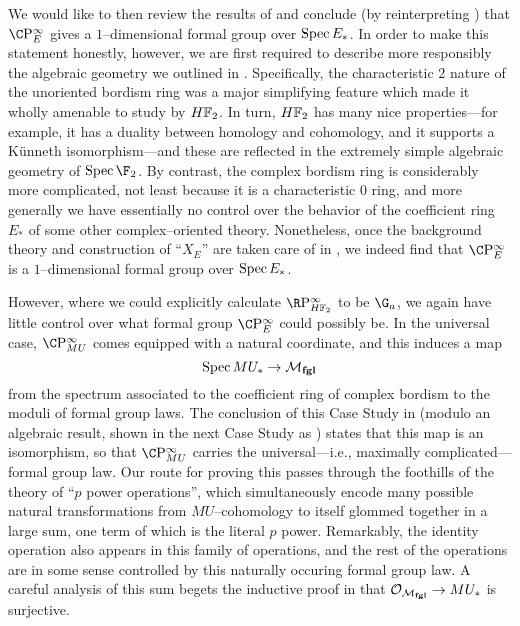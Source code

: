 We would like to then review the results of  and conclude (by reinterpreting ) that \(\CP^\infty_E\) gives a \(1\)--dimensional formal group over \(\operatorname{Spec} E_*\).  In order to make this statement honestly, however, we are first required to describe more responsibly the algebraic geometry we outlined in .  Specifically, the characteristic \(2\) nature of the unoriented bordism ring was a major simplifying feature which made it wholly amenable to study by \(\HFtwo\).  In turn, \(\HFtwo\) has many nice properties---for example, it has a duality between homology and cohomology, and it supports a K\"unneth isomorphism---and these are reflected in the extremely simple algebraic geometry of \(\Spec \F_2\).  By contrast, the complex bordism ring is considerably more complicated, not least because it is a characteristic \(0\) ring, and more generally we have essentially no control over the behavior of the coefficient ring \(E_*\) of some other complex--oriented theory.  Nonetheless, once the background theory and construction of ``\(X_E\)'' are taken care of in , we indeed find that \(\CP^\infty_E\) is a \(1\)--dimensional formal group over \(\operatorname{Spec} E_*\).

However, where we could explicitly calculate \(\RP^\infty_{\HFtwo}\) to be \(\G_a\), we again have little control over what formal group \(\CP^\infty_E\) could possibly be.  In the universal case, \(\CP^\infty_{MU}\) comes equipped with a natural coordinate, and this induces a map \[\operatorname{Spec} MU_* \to \mathcal{M}_{\mathbf{fgl}}\] from the spectrum associated to the coefficient ring of complex bordism to the moduli of formal group laws.  The conclusion of this Case Study in  (modulo an algebraic result, shown in the next Case Study as ) states that this map is an isomorphism, so that \(\CP^\infty_{MU}\) carries the universal---i.e., maximally complicated---formal group law.  Our route for proving this passes through the foothills of the theory of ``\(p\){\th} power operations'', which simultaneously encode many possible natural transformations from \(MU\)--cohomology to itself glommed together in a large sum, one term of which is the literal \(p\){\th} power.  Remarkably, the identity operation also appears in this family of operations, and the rest of the operations are in some sense controlled by this naturally occuring formal group law.  A careful analysis of this sum begets the inductive proof in  that \(\mathcal{O}_{\mathcal{M}_{\mathbf{fgl}}} \to MU_*\) is surjective.

